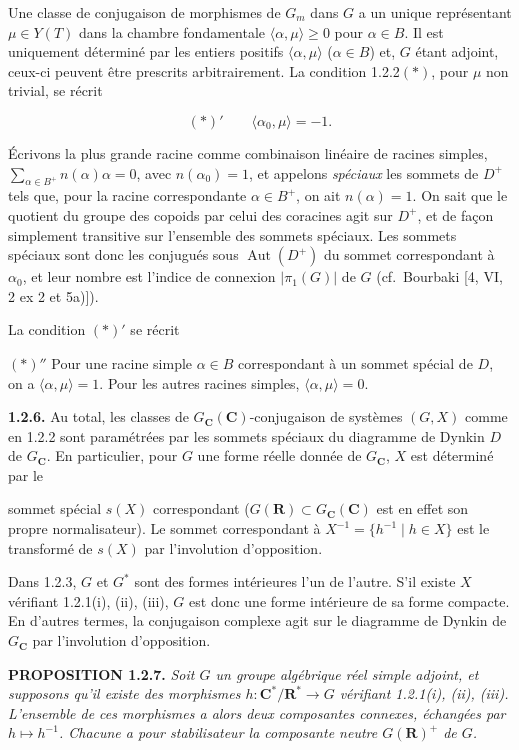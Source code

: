 \documentclass[10pt,a4paper]{article}
\newcommand{\SourcePage}[2]{\clearpage\setcounter{page}{#2}\typeout{D031_SOURCE_PAGE physical=#1 printed=#2}}
\begin{document}
Une classe de conjugaison de morphismes de \(G_m\) dans \(G\) a un unique représentant \(\mu\in Y(T)\) dans la chambre fondamentale \(\langle\alpha,\mu\rangle\ge0\) pour \(\alpha\in B\). Il est uniquement déterminé par les entiers positifs \(\langle\alpha,\mu\rangle\) (\(\alpha\in B\)) et, \(G\) étant adjoint, ceux-ci peuvent être prescrits arbitrairement. La condition 1.2.2\((*)\), pour \(\mu\) non trivial, se récrit

\[
(*)'\qquad \langle\alpha_0,\mu\rangle=-1.
\]

Écrivons la plus grande racine comme combinaison linéaire de racines simples, \(\sum_{\alpha\in B^+}n(\alpha)\alpha=0\), avec \(n(\alpha_0)=1\), et appelons \emph{spéciaux} les sommets de \(D^+\) tels que, pour la racine correspondante \(\alpha\in B^+\), on ait \(n(\alpha)=1\). On sait que le quotient du groupe des copoids par celui des coracines agit sur \(D^+\), et de façon simplement transitive sur l'ensemble des sommets spéciaux. Les sommets spéciaux sont donc les conjugués sous \(\operatorname{Aut}(D^+)\) du sommet correspondant à \(\alpha_0\), et leur nombre est l'indice de connexion \(|\pi_1(G)|\) de \(G\) (cf.~Bourbaki {[}4, VI, 2 ex 2 et 5a){]}).

La condition \((*)'\) se récrit

\((*)''\) Pour une racine simple \(\alpha\in B\) correspondant à un sommet spécial de \(D\), on a \(\langle\alpha,\mu\rangle=1\). Pour les autres racines simples, \(\langle\alpha,\mu\rangle=0\).

\textbf{1.2.6.} Au total, les classes de \(G_{\mathbf C}(\mathbf C)\)-conjugaison de systèmes \((G,X)\) comme en 1.2.2 sont paramétrées par les sommets spéciaux du diagramme de Dynkin \(D\) de \(G_{\mathbf C}\). En particulier, pour \(G\) une forme réelle donnée de \(G_{\mathbf C}\), \(X\) est déterminé par le

\SourcePage{13}{259}
sommet spécial \(s(X)\) correspondant (\(G(\mathbf R)\subset G_{\mathbf C}(\mathbf C)\) est en effet son propre normalisateur). Le sommet correspondant à \(X^{-1}=\{h^{-1}\mid h\in X\}\) est le transformé de \(s(X)\) par l'involution d'opposition.

Dans 1.2.3, \(G\) et \(G^*\) sont des formes intérieures l'un de l'autre. S'il existe \(X\) vérifiant 1.2.1(i), (ii), (iii), \(G\) est donc une forme intérieure de sa forme compacte. En d'autres termes, la conjugaison complexe agit sur le diagramme de Dynkin de \(G_{\mathbf C}\) par l'involution d'opposition.

\textbf{PROPOSITION 1.2.7.} \emph{Soit \(G\) un groupe algébrique réel simple adjoint, et supposons qu'il existe des morphismes \(h:\mathbf C^*/\mathbf R^*\to G\) vérifiant 1.2.1(i), (ii), (iii). L'ensemble de ces morphismes a alors deux composantes connexes, échangées par \(h\mapsto h^{-1}\). Chacune a pour stabilisateur la composante neutre \(G(\mathbf R)^+\) de \(G\).}
\end{document}
